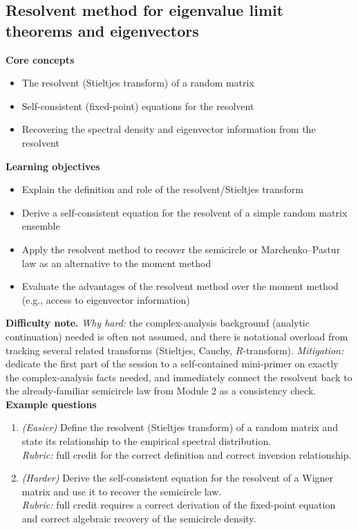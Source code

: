 \documentclass[11pt]{article}
\begin{document}
\subsection{Resolvent method for eigenvalue limit theorems and eigenvectors}
\textbf{Core concepts}
\begin{itemize}[nosep]
\item The resolvent (Stieltjes transform) of a random matrix
\item Self-consistent (fixed-point) equations for the resolvent
\item Recovering the spectral density and eigenvector information from the resolvent
\end{itemize}
\textbf{Learning objectives}
\begin{itemize}[nosep]
\item Explain the definition and role of the resolvent/Stieltjes transform
\item Derive a self-consistent equation for the resolvent of a simple random matrix ensemble
\item Apply the resolvent method to recover the semicircle or Marchenko--Pastur law as an alternative to the moment method
\item Evaluate the advantages of the resolvent method over the moment method (e.g., access to eigenvector information)
\end{itemize}
\textbf{Difficulty note.} \emph{Why hard:} the complex-analysis background (analytic continuation) needed is often not assumed, and there is notational overload from tracking several related transforms (Stieltjes, Cauchy, $R$-transform). \emph{Mitigation:} dedicate the first part of the session to a self-contained mini-primer on exactly the complex-analysis facts needed, and immediately connect the resolvent back to the already-familiar semicircle law from Module 2 as a consistency check.\\[4pt]
\textbf{Example questions}
\begin{enumerate}[nosep]
\item \emph{(Easier)} Define the resolvent (Stieltjes transform) of a random matrix and state its relationship to the empirical spectral distribution. \\
\emph{Rubric:} full credit for the correct definition and correct inversion relationship.
\item \emph{(Harder)} Derive the self-consistent equation for the resolvent of a Wigner matrix and use it to recover the semicircle law. \\
\emph{Rubric:} full credit requires a correct derivation of the fixed-point equation and correct algebraic recovery of the semicircle density.
\end{enumerate}
\end{document}

